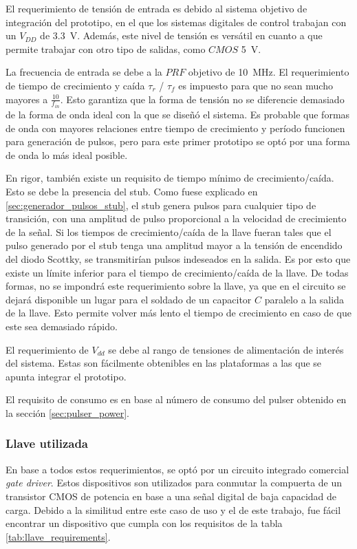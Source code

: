 El requerimiento de tensión de entrada es debido al sistema objetivo de
integración del prototipo, en el que los sistemas digitales de control trabajan
con un $V_{DD}$ de \qty{3.3}{\volt}. Además, este nivel de tensión es versátil
en cuanto a que permite trabajar con otro tipo de salidas, como $CMOS$
\qty{5}{\volt}.

La frecuencia de  entrada se debe a la $PRF$ objetivo de \qty{10}{\mega\hertz}.
El requerimiento de tiempo de crecimiento y caída $\tau_{r}$ / $\tau_{f}$ es
impuesto para que no sean mucho mayores a $\frac{10}{f_{in}}$. Esto garantiza
que la forma de tensión no se diferencie demasiado de la forma de onda ideal con
la que se diseñó el sistema. Es probable que formas de onda con mayores
relaciones entre tiempo de crecimiento y período funcionen para generación de
pulsos, pero para este primer prototipo se optó por una forma de onda lo más
ideal posible.

En rigor, también existe un requisito de tiempo mínimo de crecimiento/caída.
Esto se debe la presencia del stub. Como fuese explicado en
\ref{sec:generador_pulsos_stub}, el stub genera pulsos para cualquier tipo de
transición, con una amplitud de pulso proporcional a la velocidad de crecimiento
de la señal. Si los tiempos de crecimiento/caída de la llave fueran tales que el
pulso generado por el stub tenga una amplitud mayor a la tensión de encendido
del diodo Scottky, se transmitirían pulsos indeseados en la salida. Es por esto que
existe un límite inferior para el tiempo de crecimiento/caída de la llave. De
todas formas, no se impondrá  este requerimiento sobre la llave, ya que en el
circuito se dejará disponible un lugar para el soldado de un capacitor $C$
paralelo a la salida de la llave. Esto permite volver más lento el tiempo de
crecimiento en caso de que este sea demasiado rápido.

El requerimiento de $V_{dd}$ se debe al rango de tensiones de alimentación de
interés del sistema. Estas son fácilmente obtenibles en las plataformas a las
que se apunta integrar el prototipo.

El requisito de consumo es en base al número de consumo del pulser obtenido en
la sección \ref{sec:pulser_power}.

\subsubsection{Llave utilizada}

En base a todos estos requerimientos, se optó por un circuito integrado
comercial \textit{gate driver}. Estos dispositivos son utilizados para conmutar
la compuerta de un transistor CMOS de potencia en base a una señal digital de
baja capacidad de carga. Debido a la similitud entre este caso de uso y el de
este trabajo, fue fácil encontrar un dispositivo que cumpla con los requisitos
de la tabla \ref{tab:llave_requirements}.

